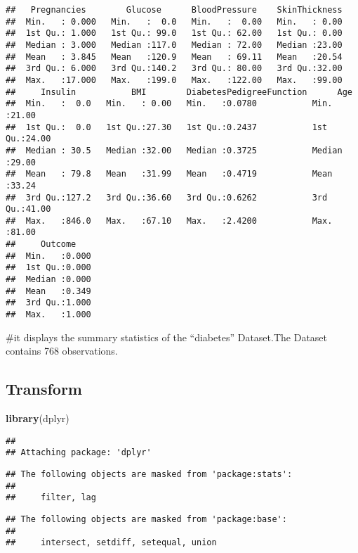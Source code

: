 \documentclass[
]{article}
\newenvironment{Shaded}{\begin{snugshade}}{\end{snugshade}}
\newcommand{\FunctionTok}[1]{\textcolor[rgb]{0.13,0.29,0.53}{\textbf{#1}}}
\newcommand{\NormalTok}[1]{#1}
\begin{document}
\begin{verbatim}
##   Pregnancies        Glucose      BloodPressure    SkinThickness  
##  Min.   : 0.000   Min.   :  0.0   Min.   :  0.00   Min.   : 0.00  
##  1st Qu.: 1.000   1st Qu.: 99.0   1st Qu.: 62.00   1st Qu.: 0.00  
##  Median : 3.000   Median :117.0   Median : 72.00   Median :23.00  
##  Mean   : 3.845   Mean   :120.9   Mean   : 69.11   Mean   :20.54  
##  3rd Qu.: 6.000   3rd Qu.:140.2   3rd Qu.: 80.00   3rd Qu.:32.00  
##  Max.   :17.000   Max.   :199.0   Max.   :122.00   Max.   :99.00  
##     Insulin           BMI        DiabetesPedigreeFunction      Age       
##  Min.   :  0.0   Min.   : 0.00   Min.   :0.0780           Min.   :21.00  
##  1st Qu.:  0.0   1st Qu.:27.30   1st Qu.:0.2437           1st Qu.:24.00  
##  Median : 30.5   Median :32.00   Median :0.3725           Median :29.00  
##  Mean   : 79.8   Mean   :31.99   Mean   :0.4719           Mean   :33.24  
##  3rd Qu.:127.2   3rd Qu.:36.60   3rd Qu.:0.6262           3rd Qu.:41.00  
##  Max.   :846.0   Max.   :67.10   Max.   :2.4200           Max.   :81.00  
##     Outcome     
##  Min.   :0.000  
##  1st Qu.:0.000  
##  Median :0.000  
##  Mean   :0.349  
##  3rd Qu.:1.000  
##  Max.   :1.000
\end{verbatim}

\#it displays the summary statistics of the ``diabetes'' Dataset.The
Dataset contains 768 observations.

\hypertarget{transform}{%
\subsection{Transform}\label{transform}}

\begin{Shaded}
\begin{Highlighting}[]
\FunctionTok{library}\NormalTok{(dplyr)}
\end{Highlighting}
\end{Shaded}

\begin{verbatim}
## 
## Attaching package: 'dplyr'
\end{verbatim}

\begin{verbatim}
## The following objects are masked from 'package:stats':
## 
##     filter, lag
\end{verbatim}

\begin{verbatim}
## The following objects are masked from 'package:base':
## 
##     intersect, setdiff, setequal, union
\end{verbatim}
\end{document}
